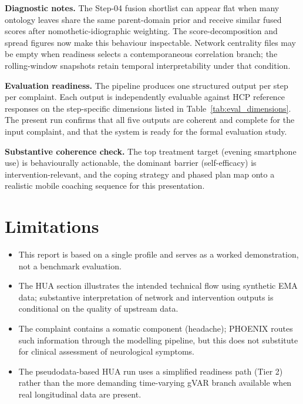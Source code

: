 \documentclass[11pt,a4paper]{article}
\begin{document}
\textbf{Diagnostic notes.} The Step-04 fusion shortlist can appear flat when many ontology leaves share the same parent-domain prior and receive similar fused scores after nomothetic-idiographic weighting. The score-decomposition and spread figures now make this behaviour inspectable. Network centrality files may be empty when readiness selects a contemporaneous correlation branch; the rolling-window snapshots retain temporal interpretability under that condition.

\textbf{Evaluation readiness.} The pipeline produces one structured output per step per complaint. Each output is independently evaluable against HCP reference responses on the step-specific dimensions listed in Table~\ref{tab:eval_dimensions}. The present run confirms that all five outputs are coherent and complete for the input complaint, and that the system is ready for the formal evaluation study.

\textbf{Substantive coherence check.} The top treatment target (evening smartphone use) is behaviourally actionable, the dominant barrier (self-efficacy) is intervention-relevant, and the coping strategy and phased plan map onto a realistic mobile coaching sequence for this presentation.

\section{Limitations}
\begin{itemize}
\item This report is based on a single profile and serves as a worked demonstration, not a benchmark evaluation.
\item The HUA section illustrates the intended technical flow using synthetic EMA data; substantive interpretation of network and intervention outputs is conditional on the quality of upstream data.
\item The complaint contains a somatic component (headache); PHOENIX routes such information through the modelling pipeline, but this does not substitute for clinical assessment of neurological symptoms.
\item The pseudodata-based HUA run uses a simplified readiness path (Tier 2) rather than the more demanding time-varying gVAR branch available when real longitudinal data are present.
\end{itemize}
\end{document}
